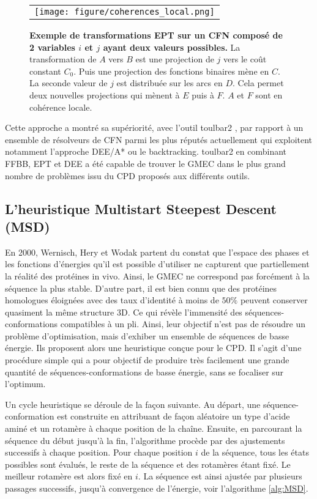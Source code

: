 \begin{figure}[!htbp]
  \centering
  \begin{tabular}{c}
    \texttt{[image: figure/coherences\_local.png]} \\
  \end{tabular}
  \caption{\textbf{Exemple de transformations EPT sur un CFN composé de 2 variables $i$ et $j$ ayant deux valeurs possibles.} La transformation de $A$ vers $B$ est une projection de $j$ vers le coût constant $C_0$. Puis une projection des fonctions binaires mène en $C$. La seconde valeur de $j$ est distribuée sur les arcs en $D$. Cela permet deux nouvelles projections qui mènent à $E$ puis à $F$. $A$ et $F$ sont en cohérence locale.}
  \label{fig:EPT}
\end{figure}

Cette approche a montré sa supériorité, avec l'outil toulbar2 \cite{Allouche14,Traore13}, par rapport à un ensemble de résolveurs de CFN parmi les plus réputés actuellement qui exploitent notamment l'approche DEE/A* ou le backtracking. toulbar2 en combinant FFBB, EPT et DEE a été capable de trouver le GMEC dans le plus grand nombre de problèmes issu du CPD proposés aux différents outils.
\subsection{L'heuristique Multistart Steepest Descent (MSD)}
\label{MSD}
En 2000, Wernisch, Hery et Wodak \cite{Wernisch00} partent du constat que l'espace des phases et les fonctions d'énergies qu'il est possible d'utiliser ne capturent que partiellement la réalité des protéines in vivo. Ainsi, le GMEC ne correspond pas forcément à la séquence la plus stable. D'autre part, il est bien connu que des protéines homologues éloignées avec des taux d'identité à moins de $50\%$ peuvent conserver quasiment la même structure 3D. Ce qui révèle l'immensité des séquences-conformations compatibles à un pli. Ainsi, leur objectif n'est pas de résoudre un problème d'optimisation, mais d'exhiber un ensemble de séquences de basse énergie. Ils proposent alors une heuristique conçue pour le CPD. Il s'agit d'une procédure simple qui a pour objectif de produire très facilement une grande quantité de séquences-conformations de basse énergie, sans se focaliser sur l'optimum.

Un cycle heuristique se déroule de la façon suivante. Au départ, une séquence-conformation est construite en attribuant de façon aléatoire un type d'acide aminé et un rotamère à chaque position de la chaîne. Ensuite, en parcourant la séquence du début jusqu'à la fin, l'algorithme procède par des ajustements successifs à chaque position. Pour chaque position $i$ de la séquence, tous les états possibles sont évalués, le reste de la séquence et des rotamères étant fixé. Le meilleur rotamère est alors fixé en $i$. La séquence est ainsi ajustée par plusieurs passages successifs, jusqu'à convergence de l'énergie, voir l'algorithme \ref{alg:MSD}.

